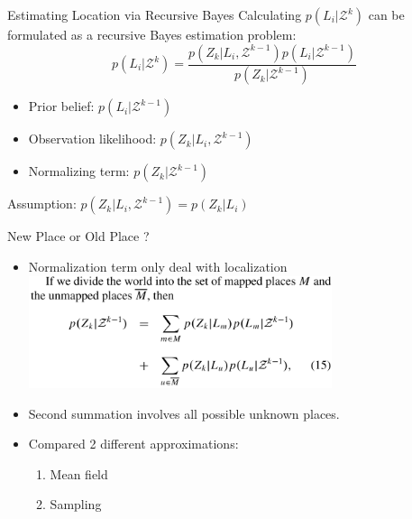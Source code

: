 \begin{frame}{Estimating Location via Recursive Bayes}
    Calculating $p(L_i|\mathcal{Z}^{k})$ can be formulated as a recursive Bayes estimation problem:
    \begin{equation*}
        p(L_i|\mathcal{Z}^{k}) = \frac{p(Z_k|L_i,\mathcal{Z}^{k-1})p(L_i|\mathcal{Z}^{k-1})}{p(Z_k|\mathcal{Z}^{k-1})}
    \end{equation*}
    \begin{itemize}
        \item Prior belief: $p(L_i|\mathcal{Z}^{k-1})$
        \item Observation likelihood: $p(Z_k|L_i,\mathcal{Z}^{k-1})$
        \item Normalizing term: $p(Z_k|\mathcal{Z}^{k-1})$
    \end{itemize}
    \vspace{0.5cm}
    Assumption: $p(Z_k|L_i,\mathcal{Z}^{k-1}) = p(Z_k|L_i)$
\end{frame}

\begin{frame}{New Place or Old Place ?}
    \begin{itemize}
        \item Normalization term only deal with localization\\ \vspace{0.3cm}
            \includegraphics[width=0.7\textwidth]{./media/nomalize_new.png}
        \item Second summation involves all possible unknown places.
        \item Compared 2 different approximations:
            \begin{enumerate}
                \item Mean field
                \item Sampling
            \end{enumerate}
    \end{itemize}
\end{frame}

